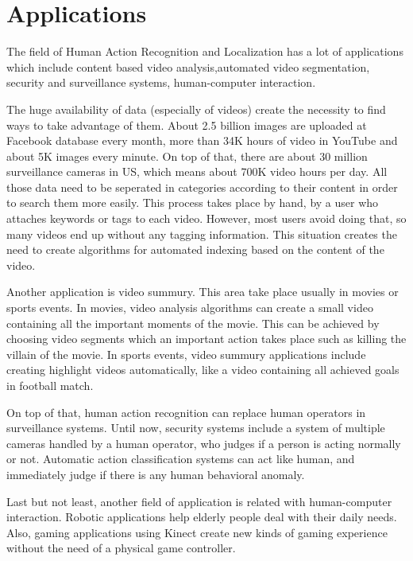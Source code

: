 \section{Applications}
The field of Human Action Recognition and Localization has a lot of applications which include 
 content based video analysis,automated video segmentation, security and surveillance systems,
human-computer interaction.

The huge availability of data (especially of videos) create the  necessity to find ways to take advantage of them.
About 2.5 billion images are uploaded at Facebook database every month, more than 34K hours of video in YouTube and
about 5K images every minute. On top of that, there are about 30 million surveillance cameras in US, which means
about 700K video hours per day. All those data need to be seperated in categories according to their content in
order to search them more easily. This process takes place by hand, by a user who attaches
keywords or tags to each video. However, most users avoid doing that, so many videos end up without any tagging information.
This situation creates the need to create algorithms for automated indexing based on the content of the video.

Another application is video summury. This area take place usually in movies or sports events. In movies,
video analysis algorithms can create a small video containing all the important moments of the movie. This
can be achieved by choosing video segments which an important action takes place such as killing the villain
of the movie. In sports events, video summury applications include creating highlight videos automatically, like
a video containing all achieved goals in football match.

On top of that, human action recognition can replace human operators in surveillance systems. Until now,
security systems include a system of multiple cameras handled by a human operator, who judges if a person
is acting normally or not. Automatic action classification systems can act like human, and immediately
judge if there is any human behavioral anomaly.

Last but not least, another field of application is related with human-computer interaction. Robotic applications
help elderly people deal with their daily needs. Also, gaming applications using Kinect create new kinds of
gaming experience without the need of a physical game controller.

